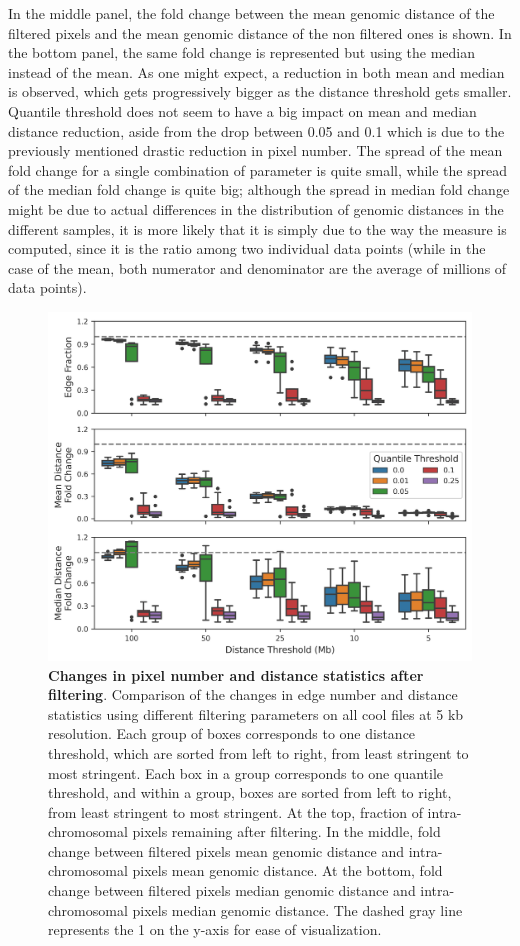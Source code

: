 In the middle panel, the fold change between the mean genomic distance of the filtered pixels and the mean genomic distance of the non filtered ones is shown. In the bottom panel, the same fold change is represented but using the median instead of the mean. As one might expect, a reduction in both mean and median is observed, which gets progressively bigger as the distance threshold gets smaller. Quantile threshold does not seem to have a big impact on mean and median distance reduction, aside from the drop between 0.05 and 0.1 which is due to the previously mentioned drastic reduction in pixel number. The spread of the mean fold change for a single combination of parameter is quite small, while the spread of the median fold change is quite big; although the spread in median fold change might be due to actual differences in the distribution of genomic distances in the different samples, it is more likely that it is simply due to the way the measure is computed, since it is the ratio among two individual data points (while in the case of the mean, both numerator and denominator are the average of millions of data points).

\begin{figure}[ht]
  \centering
  \includegraphics[width=1\textwidth]{filtering_stats.png}
  \caption{\textbf{Changes in pixel number and distance statistics after filtering}. Comparison of the changes in edge number and distance statistics using different filtering parameters on all cool files at 5 kb resolution. Each group of boxes corresponds to one distance threshold, which are sorted from left to right, from least stringent to most stringent. Each box in a group corresponds to one quantile threshold, and within a group, boxes are sorted from left to right, from least stringent to most stringent. At the top, fraction of intra-chromosomal pixels remaining after filtering. In the middle, fold change between filtered pixels mean genomic distance and intra-chromosomal pixels mean genomic distance. At the bottom, fold change between filtered pixels median genomic distance and intra-chromosomal pixels median genomic distance. The dashed gray line represents the 1 on the y-axis for ease of visualization.}
  \label{fig:filtering}
\end{figure}

